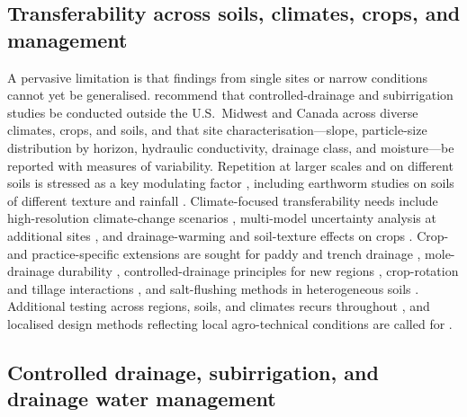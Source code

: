 \documentclass[11pt]{article}
\begin{document}
\subsection{Transferability across soils, climates, crops, and management}

A pervasive limitation is that findings from single sites or narrow conditions
cannot yet be generalised. \textcite{Singh2022b} recommend that
controlled-drainage and subirrigation studies be conducted outside the U.S.\
Midwest and Canada across diverse climates, crops, and soils, and that site
characterisation---slope, particle-size distribution by horizon, hydraulic
conductivity, drainage class, and moisture---be reported with measures of
variability. Repetition at larger scales and on different soils is stressed as a
key modulating factor \parencite{Bilotta2008,Goeken2015}, including earthworm
studies on soils of different texture and rainfall \parencite{Nuutinen2001,Nuutinen2011}.
Climate-focused transferability needs include high-resolution climate-change
scenarios \parencite{Rasmussen2018}, multi-model uncertainty analysis at
additional sites \parencite{Jeantet2022}, and drainage-warming and soil-texture
effects on crops \parencite{Jin2008}. Crop- and practice-specific extensions are
sought for paddy and trench drainage \parencite{Rahimi2024,Jia2023}, mole-drainage
durability \parencite{JHA1995}, controlled-drainage principles for new regions
\parencite{Sojka2020}, crop-rotation and tillage interactions
\parencite{Ojeda2018}, and salt-flushing methods in heterogeneous soils
\parencite{Yu2018}. Additional testing across regions, soils, and climates recurs
throughout \parencite{Singh2020b,Malota2024,Salazar2008,Holbak2021}, and localised
design methods reflecting local agro-technical conditions are called for
\parencite{Tlapáková2017,Sinai2006,He2002}.

\subsection{Controlled drainage, subirrigation, and drainage water management}
\end{document}

